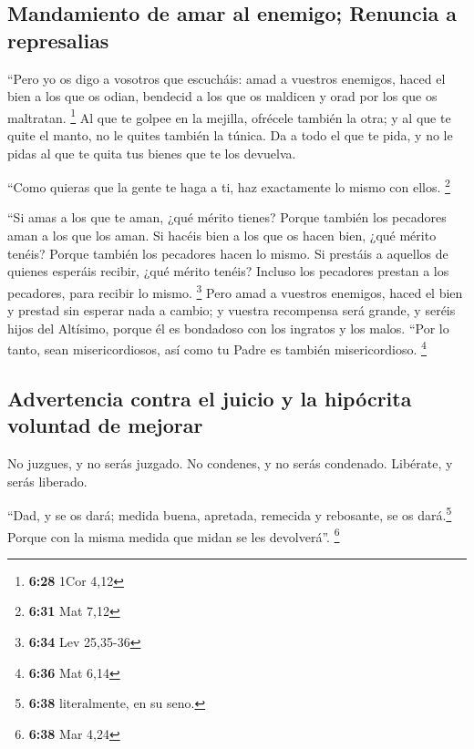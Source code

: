 \hypertarget{mandamiento-de-amar-al-enemigo-renuncia-a-represalias}{%
\subsection{Mandamiento de amar al enemigo; Renuncia a
represalias}\label{mandamiento-de-amar-al-enemigo-renuncia-a-represalias}}

 ``Pero yo os digo a vosotros que escucháis: amad a
vuestros enemigos, haced el bien a los que os odian, 
bendecid a los que os maldicen y orad por los que os maltratan.
\footnote{\textbf{6:28} 1Cor 4,12}  Al que te golpee en
la mejilla, ofrécele también la otra; y al que te quite el manto, no le
quites también la túnica.  Da a todo el que te pida, y no
le pidas al que te quita tus bienes que te los devuelva.

 ``Como quieras que la gente te haga a ti, haz
exactamente lo mismo con ellos. \footnote{\textbf{6:31} Mat 7,12}

 ``Si amas a los que te aman, ¿qué mérito tienes? Porque
también los pecadores aman a los que los aman.  Si hacéis
bien a los que os hacen bien, ¿qué mérito tenéis? Porque también los
pecadores hacen lo mismo.  Si prestáis a aquellos de
quienes esperáis recibir, ¿qué mérito tenéis? Incluso los pecadores
prestan a los pecadores, para recibir lo mismo. \footnote{\textbf{6:34}
  Lev 25,35-36}  Pero amad a vuestros enemigos, haced el
bien y prestad sin esperar nada a cambio; y vuestra recompensa será
grande, y seréis hijos del Altísimo, porque él es bondadoso con los
ingratos y los malos.  ``Por lo tanto, sean
misericordiosos, así como tu Padre es también misericordioso.
\footnote{\textbf{6:36} Mat 6,14}

\hypertarget{advertencia-contra-el-juicio-y-la-hipuxf3crita-voluntad-de-mejorar}{%
\subsection{Advertencia contra el juicio y la hipócrita voluntad de
mejorar}\label{advertencia-contra-el-juicio-y-la-hipuxf3crita-voluntad-de-mejorar}}

 No juzgues, y no serás juzgado. No condenes, y no serás
condenado. Libérate, y serás liberado.

 ``Dad, y se os dará; medida buena, apretada, remecida y
rebosante, se os dará.\footnote{\textbf{6:38} literalmente, en su seno.}
Porque con la misma medida que midan se les devolverá''. \footnote{\textbf{6:38}
  Mar 4,24}

